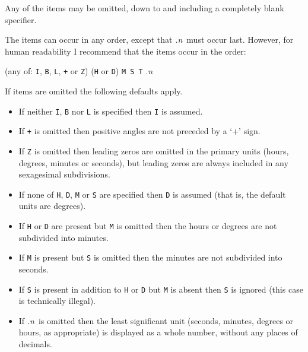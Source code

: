 \documentclass[twoside,11pt]{starlink}
\begin{document}
Any of the items may be omitted, down to and including a
completely blank specifier.

The items can occur in any order, except that \textit{.n}\, must
occur last. However, for human readability I recommend that the
items occur in the order:

\begin{center}
(any of: \texttt{I}, \texttt{B}, \texttt{L}, \texttt{+} or \texttt{Z}) (\texttt{H}
or \texttt{D}) \texttt{M S T} .\textit{n}
\end{center}

If items are omitted the following defaults apply.

\begin{itemize}

  \item If neither \texttt{I}, \texttt{B} nor \texttt{L} is specified
   then \texttt{I} is assumed.

  \item If \texttt{+} is omitted then positive angles are not
   preceded by a `$+$' sign.

  \item If \texttt{Z} is omitted then leading zeros are omitted in the
   primary units (hours, degrees, minutes or seconds), but leading zeros
   are always included in any sexagesimal subdivisions.

  \item If none of \texttt{H}, \texttt{D}, \texttt{M} or \texttt{S} are specified
   then \texttt{D} is assumed (that is, the default units are degrees).

  \item If \texttt{H} or \texttt{D} are present but \texttt{M} is omitted then
   the hours or degrees are not subdivided into minutes.

  \item If \texttt{M} is present but \texttt{S} is omitted then the minutes
   are not subdivided into seconds.

  \item If \texttt{S} is present in addition to \texttt{H} or \texttt{D} but
   \texttt{M} is absent then \texttt{S} is ignored (this case is technically
   illegal).

  \item If \textit{.n}\, is omitted then the least significant unit
   (seconds, minutes, degrees or hours, as appropriate) is
   displayed as a whole number, without any places of decimals.

\end{itemize}
\end{document}
